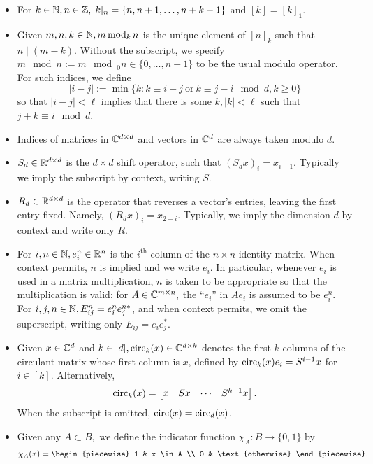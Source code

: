 \begin{itemize}
\item For $k \in \mathbb{N}, n \in \mathbb{Z}, [k]_n = \{n, n + 1, \ldots, n + k - 1\}$ and $[k] = [k]_1$.
\item Given $m, n, k \in \mathbb{N}, m \operatorname{\mathbin{mod}}_k n$ is the unique element of $[n]_k$ such that $n \mid (m - k)$.  Without the subscript, we specify $m \mod n := m \mod_0 n \in \{0, \ldots, n - 1\}$ to be the usual modulo operator.  For such indices, we define \begin{equation} |i - j| := \min \{k : k \equiv i - j \ \text{or} \ k \equiv j - i \mod d, k \ge 0\} \label{eq:modabs} \end{equation} so that $|i - j| < \ell$ implies that there is some $k, |k| < \ell$ such that $j + k \equiv i \mod d$.
\item Indices of matrices in $\mathbb{C}^{d \times d}$ and vectors in $\mathbb{C}^d$ are always taken modulo $d$.
\item $S_d \in \mathbb{R}^{d \times d}$ is the $d \times d$ shift operator, such that $(S_d x)_i = x_{i - 1}$.  Typically we imply the subscript by context, writing $S$.
\item $R_d \in \mathbb{R}^{d \times d}$ is the operator that reverses a vector's entries, leaving the first entry fixed.  Namely, $(R_d x)_i = x_{2 - i}$.  Typically, we imply the dimension $d$ by context and write only $R$.
\item For $i, n \in \mathbb{N}, e_i^n \in \mathbb{R}^n$ is the $i^{\text{th}}$ column of the $n \times n$ identity matrix.  When context permits, $n$ is implied and we write $e_i$.  In particular, whenever $e_i$ is used in a matrix multiplication, $n$ is taken to be appropriate so that the multiplication is valid; for $A \in \mathbb{C}^{m \times n},$ the ``$e_i$'' in $A e_i$ is assumed to be $e_i^n$.  For $i, j, n \in \mathbb{N}, E_{ij}^n = e_i^n e_j^{n*}$, and when context permits, we omit the superscript, writing only $E_{ij} = e_i e_j^*$.
\item Given $x \in \mathbb{C}^d$ and $k \in [d], \operatorname{circ}_k(x) \in \mathbb{C}^{d \times k}$ denotes the first $k$ columns of the circulant matrix whose first column is $x$, defined by $\operatorname{circ}_k(x) e_i = S^{i - 1} x$ for $i \in [k]$.  Alternatively, \[\operatorname{circ}_k(x) = \begin{bmatrix} x & S x & \cdots & S^{k-1} x \end{bmatrix}.\]  When the subscript is omitted, $\operatorname{circ}(x) = \operatorname{circ}_d(x)$.
  \item Given any $A \subset B,$ we define the indicator function $\chi_A : B \to \{0, 1\}$ by \[\chi_A(x) = \begin{piecewise} 1 & x \in A \\ 0 & \text{otherwise} \end{piecewise}.\]

\end{itemize}
